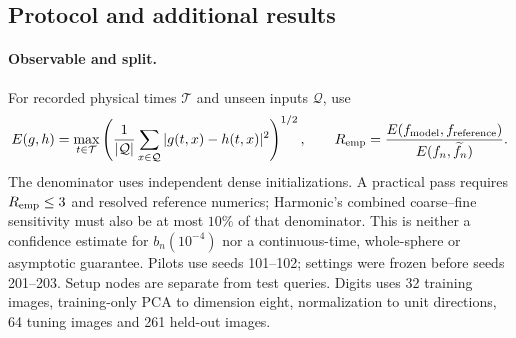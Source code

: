 \subsection{Protocol and additional results}
\label{app:empirical}
\begingroup
\small
\paragraph{Observable and split.}
For recorded physical times $\mathcal T$ and unseen inputs $\mathcal Q$, use
\[
 E(g,h)=\max_{t\in\mathcal T}
 \left(\frac1{|\mathcal Q|}\sum_{x\in\mathcal Q}
 |g(t,x)-h(t,x)|^2\right)^{1/2},\qquad
 R_{\rm emp}=\frac{E(f_{\rm model},f_{\rm reference})}
 {E(f_n,\widetilde f_n)}.
\]
The denominator uses independent dense initializations. A practical pass
requires $R_{\rm emp}\le3$ and resolved reference numerics; Harmonic's
combined coarse--fine sensitivity must also be at most $10\%$ of that
denominator. This is neither a confidence estimate for $b_n(10^{-4})$ nor a
continuous-time, whole-sphere or asymptotic guarantee. Pilots use seeds
101--102; settings were frozen before seeds 201--203. Setup nodes are
separate from test queries. Digits uses 32 training images, training-only
PCA to dimension eight, normalization to unit directions, 64 tuning images
and 261 held-out images.

